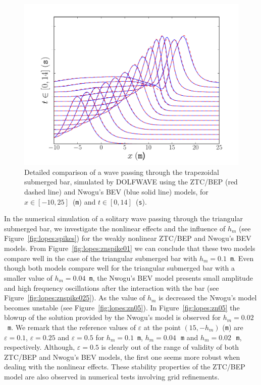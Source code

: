 \begin{figure}
  \begin{center}
    \includegraphics[width=\largefig]{chapters/lopes/pdf/ZhaoNwogu.pdf}
  \end{center}
  \caption{Detailed comparison of a wave passing through the
    trapezoidal submerged bar, simulated by DOLFWAVE using the ZTC/BEP
    (red dashed line) and Nwogu's BEV (blue solid line) models, for
    $x\in[-10,25]$~({\tt m}) and $t\in[0,14]$~({\tt s}).}
  \label{fig:lopes:zhaonwogu}
\end{figure}

In the numerical simulation of a solitary wave passing through the
triangular submerged bar, we investigate the nonlinear effects and the
influence of $h_m$ (see Figure~\ref{fig:lopes:spikes}) for the weakly
nonlinear ZTC/BEP and Nwogu's BEV models.  From
Figure~\ref{fig:lopes:znspike01} we can conclude that these two models
compare well in the case of the triangular submerged bar with
$h_m=0.1$~{\tt m}.  Even though both models compare well for the
triangular submerged bar with a smaller value of $h_m=0.04$~{\tt m},
the Nwogu's BEV model presents small amplitude and high frequency
oscillations after the interaction with the bar (see
Figure~\ref{fig:lopes:znspike025}).  As the value of $h_m$ is
decreased the Nwogu's model becomes unstable (see
Figure~\ref{fig:lopes:zn05}).  In Figure~\ref{fig:lopes:zn05} the
blowup of the solution provided by the Nwogu's model is observed for
$h_m=0.02$~{\tt m}.  We remark that the reference values of
$\varepsilon$ at the point $(15,-h_m)$ ({\tt m}) are
$\varepsilon=0.1$, $\varepsilon=0.25$ and $\varepsilon=0.5$ for
$h_m=0.1$~{\tt m}, $h_m=0.04$\,~{\tt m} and $h_m=0.02$\,~{\tt m},
respectively. Although, $\varepsilon=0.5$ is clearly out of the range
of validity of both ZTC/BEP and Nwogu's BEV models, the first one
seems more robust when dealing with the nonlinear effects. These
stability properties of the ZTC/BEP model are also observed in
numerical tests involving grid refinements.

